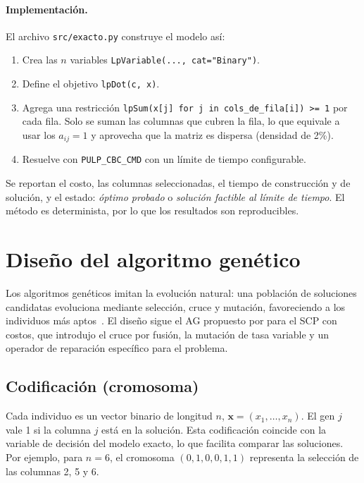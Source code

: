 \documentclass[11pt,a4paper]{article}
\begin{document}
\paragraph{Implementación.} El archivo \texttt{src/exacto.py} construye el modelo así:
\begin{enumerate}[nosep]
  \item Crea las $n$ variables \texttt{LpVariable(..., cat="Binary")}.
  \item Define el objetivo \texttt{lpDot(c, x)}.
  \item Agrega una restricción \texttt{lpSum(x[j] for j in cols\_de\_fila[i]) >= 1} por cada fila.
  Solo se suman las columnas que cubren la fila, lo que equivale a usar los $a_{ij}=1$ y aprovecha
  que la matriz es dispersa (densidad de 2\%).
  \item Resuelve con \texttt{PULP\_CBC\_CMD} con un límite de tiempo configurable.
\end{enumerate}
Se reportan el costo, las columnas seleccionadas, el tiempo de construcción y de solución, y el
estado: \emph{óptimo probado} o \emph{solución factible al límite de tiempo}. El método es
determinista, por lo que los resultados son reproducibles.

\section{Diseño del algoritmo genético}
Los algoritmos genéticos imitan la evolución natural: una población de soluciones candidatas
evoluciona mediante selección, cruce y mutación, favoreciendo a los individuos más
aptos~\citep{holland1975,goldberg1989,eiben2015}. El diseño sigue el AG propuesto por
\citet{beasley1996ga} para el SCP con costos, que introdujo el cruce por fusión, la mutación de
tasa variable y un operador de reparación específico para el problema.

\subsection{Codificación (cromosoma)}
Cada individuo es un vector binario de longitud $n$, $\mathbf{x}=(x_1,\dots,x_n)$. El gen $j$
vale 1 si la columna $j$ está en la solución. Esta codificación coincide con la variable de decisión del
modelo exacto, lo que facilita comparar las soluciones. Por ejemplo, para $n=6$, el
cromosoma $(0,1,0,0,1,1)$ representa la selección de las columnas 2, 5 y 6.
\end{document}
